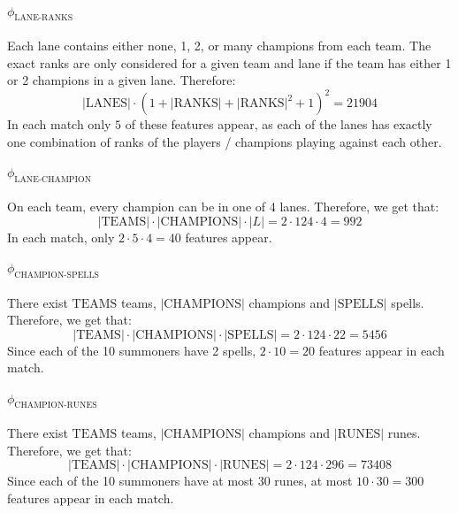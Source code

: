 \paragraph{$\phi_{\text{LANE-RANKS}}$}
\begin{adjustwidth}{2cm}{}
Each lane contains either none, 1, 2, or many champions from each team. The exact ranks are only considered for a given team and lane if the team has either 1 or 2 champions in a given lane. Therefore:
\[|\text{LANES}| \cdot (1 + |\text{RANKS}| + |\text{RANKS}|^2 + 1)^2 = 21904\]
In each match only $5$ of these features appear, as each of the lanes has exactly one combination of ranks of the players / champions playing against each other.
\end{adjustwidth}

\paragraph{$\phi_{\text{LANE-CHAMPION}}$}
\begin{adjustwidth}{2cm}{}
On each team, every champion can be in one of 4 lanes. Therefore, we get that:
\[|\text{TEAMS}| \cdot |\text{CHAMPIONS}| \cdot |L| = 2 \cdot 124 \cdot 4 = 992\]
In each match, only $2 \cdot 5 \cdot 4 = 40$ features appear.
\end{adjustwidth}

\paragraph{$\phi_{\text{CHAMPION-SPELLS}}$}
\begin{adjustwidth}{2cm}{}
There exist $\text{TEAMS}$ teams, $|\text{CHAMPIONS}|$ champions and $|\text{SPELLS}|$ spells. Therefore, we get that:
\[|\text{TEAMS}| \cdot |\text{CHAMPIONS}| \cdot |\text{SPELLS}| = 2 \cdot 124 \cdot 22 = 5456\]
Since each of the 10 summoners have 2 spells, $2 \cdot 10 = 20$ features appear in each match.
\end{adjustwidth}

\paragraph{$\phi_{\text{CHAMPION-RUNES}}$}
\begin{adjustwidth}{2cm}{}
There exist $\text{TEAMS}$ teams, $|\text{CHAMPIONS}|$ champions and $|\text{RUNES}|$ runes. Therefore, we get that:
\[|\text{TEAMS}| \cdot |\text{CHAMPIONS}| \cdot |\text{RUNES}| = 2 \cdot 124 \cdot 296 = 73408\]
Since each of the 10 summoners have at most 30 runes, at most $10 \cdot 30 = 300$ features appear in each match.
\end{adjustwidth}

